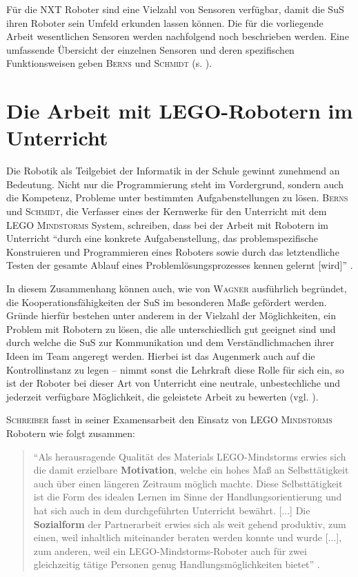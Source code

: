 \documentclass[paper=a4, DIV=calc, BCOR=12mm, twoside=on, onecolumn=on, open = right, titlepage =on, parskip =half-, headsepline = on, footsepline = off, chapterprefix = off, appendixprefix = on, fontsize = 12pt, numbers = noenddot, abstract = on]{scrbook}
\begin{document}
Für die NXT Roboter sind eine Vielzahl von Sensoren verfügbar, damit die SuS ihren Roboter sein Umfeld erkunden lassen können. Die für die vorliegende Arbeit wesentlichen Sensoren werden nachfolgend noch beschrieben werden. Eine umfassende Übersicht der einzelnen Sensoren und deren spezifischen Funktionsweisen geben \textsc{Berns} und \textsc{Schmidt} (s. \cite[Kapitel 4.2]{berns:10}). 

\par \singlespacing
 \section{Die Arbeit mit LEGO-Robotern im Unterricht}
\onehalfspacing
Die Robotik als Teilgebiet der Informatik in der Schule gewinnt zunehmend an Bedeutung. Nicht nur die Programmierung steht im Vordergrund, sondern auch die Kompetenz, Probleme unter bestimmten Aufgabenstellungen zu lösen. \textsc{Berns} und \textsc{Schmidt}, die Verfasser eines der Kernwerke für den Unterricht mit dem \textsc{LEGO Mindstorms} System, schreiben, dass bei der Arbeit mit Robotern im Unterricht "`durch eine konkrete Aufgabenstellung, das problemspezifische Konstruieren und Programmieren eines Roboters sowie durch das letztendliche Testen der gesamte Ablauf eines Problemlösungsprozesses kennen gelernt [wird]"' \cite[S.2]{berns:10}.

In diesem Zusammenhang können auch, wie von \textsc{Wagner} ausführlich begründet, die Kooperationsfähigkeiten der SuS im besonderen Maße gefördert werden. Gründe hierfür bestehen unter anderem in der Vielzahl der Möglichkeiten, ein Problem mit Robotern zu lösen, die alle unterschiedlich gut geeignet sind und durch welche die SuS zur Kommunikation und dem Verständlichmachen ihrer Ideen im Team angeregt werden. Hierbei ist das Augenmerk auch auf die Kontrollinstanz zu legen -- nimmt sonst die Lehrkraft diese Rolle für sich ein, so ist der Roboter bei dieser Art von Unterricht eine neutrale, unbestechliche und jederzeit verfügbare Möglichkeit, die geleistete Arbeit zu bewerten (vgl. \cite[S.6f.]{wagner:05}).

\textsc{Schreiber} fasst in seiner Examensarbeit den Einsatz von \textsc{LEGO Mindstorms} Robotern wie folgt zusammen:
\begin{quote}
"`Als herausragende Qualität des Materials LEGO-Mindstorms erwies sich die damit erzielbare \textbf{Motivation}, welche ein hohes Maß an Selbsttätigkeit auch über einen längeren Zeitraum möglich machte. Diese Selbsttätigkeit ist die Form des idealen Lernen im Sinne der Handlungsorientierung und hat sich auch in dem durchgeführten Unterricht bewährt. [...] Die \textbf{Sozialform} der Partnerarbeit erwies sich als weit gehend produktiv, zum einen, weil inhaltlich miteinander beraten werden konnte und wurde [...], zum anderen, weil ein LEGO-Mindstorms-Roboter auch für zwei gleichzeitig tätige Personen genug Handlungsmöglichkeiten bietet"' \cite[S.47f.]{schreiber:04}.
\end{quote}
\end{document}
